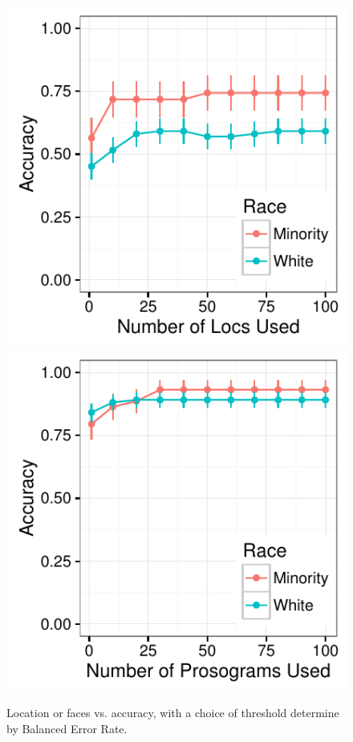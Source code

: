 \begin{figure}
  \centering
    \includegraphics[width=0.48\linewidth]{fig/census/locs_v_accuracy_race_labeled_ber-eps-converted-to.pdf}
    \includegraphics[width=0.48\linewidth]{fig/census/faces_v_accuracy_race_labeled_ber-eps-converted-to.pdf}
  \caption{Location or faces vs. accuracy, with a choice of threshold determine by Balanced Error Rate.\label{fig:debias}}
\end{figure}


